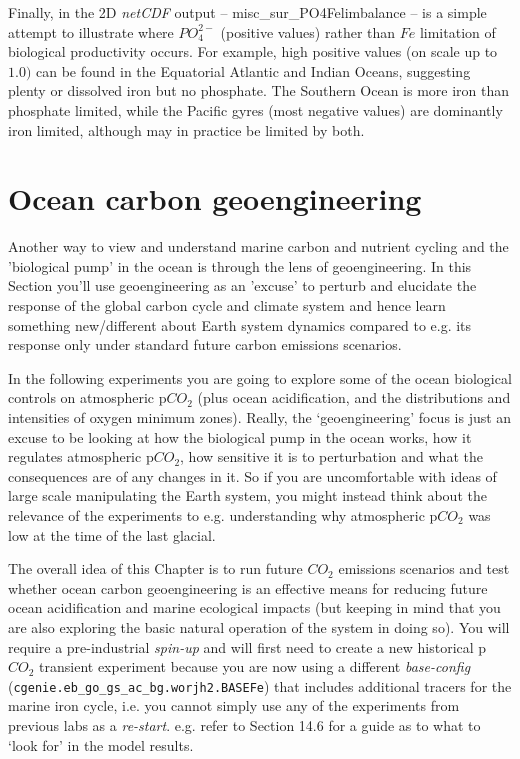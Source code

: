\documentclass[11pt,fleqn]{book} %
\begin{document}
Finally, in the  2D \textit{netCDF} output -- \textsf{\footnotesize misc\_sur\_PO4Felimbalance} -- is a simple attempt to illustrate where \(PO^{2-}_{4}\) (positive values) rather than \(Fe\) limitation of biological productivity occurs. For example, high positive values (on scale up to \(1.0)\) can be found in the Equatorial Atlantic and Indian Oceans, suggesting plenty or dissolved iron but no phosphate. The Southern Ocean is more iron than phosphate limited, while the Pacific gyres (most negative values) are dominantly iron limited, although may in practice be limited by both.


\newpage



\section{Ocean carbon geoengineering}

\noindent Another way to view and understand marine carbon and nutrient cycling and the 'biological pump' in the ocean is through the lens of geoengineering. In this Section you'll use geoengineering as an 'excuse' to perturb and elucidate the response of the global carbon cycle and climate system and hence learn something new/different about Earth system dynamics compared to e.g. its response only under standard future carbon emissions scenarios.

In the following experiments you are going to explore some of the ocean biological controls on atmospheric p\(CO_{2}\) (plus ocean acidification, and the distributions and intensities of oxygen minimum zones). Really, the ‘geoengineering’ focus is just an excuse to be looking at how the biological pump in the ocean works, how it regulates atmospheric p\(CO_{2}\), how sensitive it is to perturbation and what the consequences are of any changes in it. So if you are uncomfortable with ideas of large scale manipulating the Earth system, you might instead think about the relevance of the experiments to e.g. understanding why atmospheric p\(CO_{2}\) was low at the time of the last glacial.

The overall idea of this Chapter is to run future \(CO_{2}\) emissions scenarios and test whether ocean carbon geoengineering is an effective means for reducing future ocean acidification and marine ecological impacts (but keeping in mind that you are also exploring the basic natural operation of the system in doing so). You will require a pre-industrial \textit{spin-up} and will first need to create a new historical p\(CO_{2}\) transient experiment because you are now using a different \textit{base-config} (\texttt{cgenie.eb\_go\_gs\_ac\_bg.worjh2.BASEFe}) that includes additional tracers for the marine iron cycle, i.e. you cannot simply use any of the experiments from previous labs as a \textit{re-start}. e.g. refer to Section 14.6  for a guide as to what to ‘look for’ in the model results.
\end{document}
